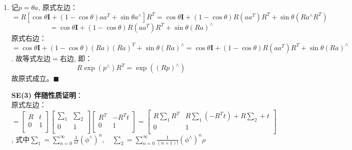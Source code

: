 \documentclass[12pt,a4paper]{ctexart}
\begin{document}
\begin{enumerate}
	\item 记$ p=\theta a $, 原式左边：
	$$
	=R[\cos \theta \textbf{I}+(1-\cos \theta)aa^{T}+\sin\theta a^{\wedge}]R^{T}=\cos\theta\textbf{I}+(1-\cos\theta)R(aa^{T})R^{T}+\sin\theta(Ra^{\wedge}R^{T})
	$$
	$$
	=\cos\theta\textbf{I}+(1-\cos\theta)R(aa^{T})R^{T}+\sin\theta(Ra)^{\wedge}
	$$
	原式右边：
	$$
	=\cos \theta \textbf{I}+(1-\cos \theta)(Ra)(Ra)^{T}+\sin\theta (Ra)^{\wedge}
	=\cos\theta\textbf{I}+(1-\cos\theta)R(aa^{T})R^{T}+\sin\theta(Ra)^{\wedge}
	$$. 故等式左边$ = $右边, 即：
	\begin{equation}
	R\exp(p^{\wedge})R^{T}=\exp((Rp)^{\wedge})
	\end{equation}
	故原式成立。$ \blacksquare $
	
	\textbf{SE(3) 伴随性质证明}：\\
	原式左边：
	$$
	=
	\begin{bmatrix}
	R & t \\
	0 & 1 \\
	\end{bmatrix}
	\begin{bmatrix}
	\sum_{1} & \sum_{2} \\
	0 & 1 \\
	\end{bmatrix}
	\begin{bmatrix}
	R^{T} & -R^{T}t \\
	0 & 1 \\
	\end{bmatrix}
	=
	\begin{bmatrix}
	R\sum_{1}R^{T} & R\sum_{1}(-R^{T}t)+R\sum_{2}+t \\
	0 & 1 \\
	\end{bmatrix}
	$$, 式中$ \sum_{1}=\sum_{n=0}^{\infty}\frac{1}{n!}(\phi^{\wedge})^{n},\quad \sum_{2}=\sum_{n=0}^{\infty}\frac{1}{(n+1)!}(\phi^{\wedge})^{n}\rho $
	

\end{enumerate}
\end{document}
